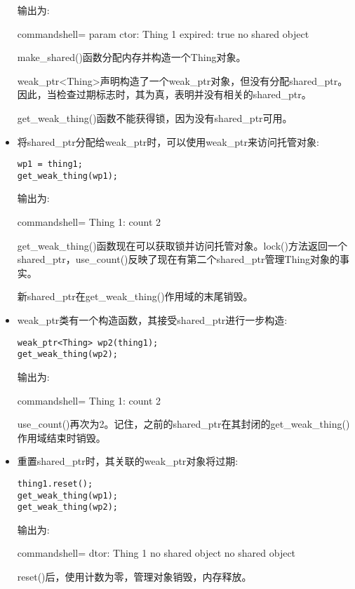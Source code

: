 \begin{itemize}
输出为:

\begin{tcblisting}{commandshell={}}
param ctor: Thing 1
expired: true
no shared object
\end{tcblisting}

make\_shared()函数分配内存并构造一个Thing对象。

weak\_ptr<Thing>声明构造了一个weak\_ptr对象，但没有分配shared\_ptr。因此，当检查过期标志时，其为真，表明并没有相关的shared\_ptr。

get\_weak\_thing()函数不能获得锁，因为没有shared\_ptr可用。

\item 
将shared\_ptr分配给weak\_ptr时，可以使用weak\_ptr来访问托管对象:

\begin{lstlisting}[style=styleCXX]
wp1 = thing1;
get_weak_thing(wp1);
\end{lstlisting}

输出为:

\begin{tcblisting}{commandshell={}}
Thing 1: count 2
\end{tcblisting}

get\_weak\_thing()函数现在可以获取锁并访问托管对象。lock()方法返回一个shared\_ptr，use\_count()反映了现在有第二个shared\_ptr管理Thing对象的事实。

新shared\_ptr在get\_weak\_thing()作用域的末尾销毁。

\item 
weak\_ptr类有一个构造函数，其接受shared\_ptr进行一步构造:

\begin{lstlisting}[style=styleCXX]
weak_ptr<Thing> wp2(thing1);
get_weak_thing(wp2);
\end{lstlisting}

输出为:

\begin{tcblisting}{commandshell={}}
Thing 1: count 2
\end{tcblisting}

use\_count()再次为2。记住，之前的shared\_ptr在其封闭的get\_weak\_thing()作用域结束时销毁。

\item 
重置shared\_ptr时，其关联的weak\_ptr对象将过期:

\begin{lstlisting}[style=styleCXX]
thing1.reset();
get_weak_thing(wp1);
get_weak_thing(wp2);
\end{lstlisting}

输出为:

\begin{tcblisting}{commandshell={}}
dtor: Thing 1
no shared object
no shared object
\end{tcblisting}

reset()后，使用计数为零，管理对象销毁，内存释放。
\end{itemize}



